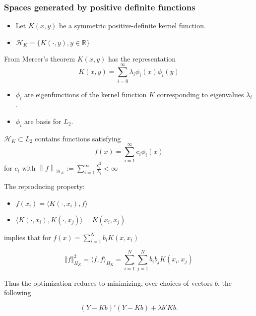 \documentclass{beamer}
\renewcommand{\H}{\mathcal{H}}
\newcommand{\Real}{\ensuremath{ \mathbb{R} }}
\newcommand{\norm}[1]{\left\|#1\right\|}
\newcommand{\inner}[2]{\langle #1, #2 \rangle}
\begin{document}
\begin{frame}\frametitle{Spaces generated by positive definite functions}
\begin{itemize}
\item Let $K(x,y)$ be a symmetric positive-definite kernel function. 
\item $\H_K = \{K(\cdot, y), y \in \Real\}$
\end{itemize}
From Mercer's theorem $K(x,y)$ has the representation
\[K(x,y)=\sum_{i=0}^{\infty}\lambda_{i}\phi_{i}(x)\phi_{i}(y)\]
\begin{itemize}
\item $\phi_{i}$ are eigenfunctions of the kernel function $K$
corresponding to eigenvalues $\lambda_{i}$.
\item $\phi_{i}$ are basis for $L_2$.
\end{itemize}
$\H_{K}\subset L_{2}$ contains functions satisfying
\[f(x)=\sum_{i=1}^{\infty}c_{i}\phi_{i}(x)\] 
 for $c_{i} \mbox{ with  }\norm{f}_{\H_K}:= \sum_{i=1}^{\infty}\frac{{c_{i}^{2}}}{\lambda_{i}}<\infty$
\end{frame}

%
\begin{frame}
The reproducing property: 
\begin{itemize}
\item $f(x_i) = \inner{K(\cdot, x_i)}{f}$
\item $\inner{K(\cdot, x_i)}{K(\cdot, x_j)} = K(x_i, x_j)$
\end{itemize}
implies that for $f(x)=\sum_{i=1}^{N}b_{i}K(x,x_{i})$

\[\left\Vert f\right\Vert _{H_{K}}^{2}=\inner{f}{f}_{H_{K}}=\sum_{i=1}^{N}\sum_{j=1}^{N}b_{i}b_{j}K(x_{i},x_{j})\]

Thus the optimization reduces to minimizing, over choices of vectors $b$, the
following

\[(Y-Kb)'(Y-Kb)+\lambda b'Kb.\]
\end{frame}
\end{document}
